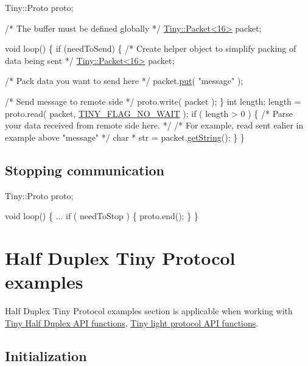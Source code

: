 \begin{DoxyCode}
Tiny::Proto proto;

\textcolor{comment}{/* The buffer must be defined globally */}
\hyperlink{classTiny_1_1Packet}{Tiny::Packet<16>} packet;

\textcolor{keywordtype}{void} loop()
\{
    \textcolor{keywordflow}{if} (needToSend)
    \{
        \textcolor{comment}{/* Create helper object to simplify packing of data being sent */}
        \hyperlink{classTiny_1_1Packet}{Tiny::Packet<16>} packet;

        \textcolor{comment}{/* Pack data you want to send here */}
        packet.\hyperlink{classTiny_1_1IPacket_a9d5ba62a453b9cd364c0e214c245f11d}{put}( \textcolor{stringliteral}{"message"} );

        \textcolor{comment}{/* Send message to remote side */}
        proto.write( packet );
    \}
    \textcolor{keywordtype}{int} length;
    length = proto.read( packet, \hyperlink{group__FLAGS__GROUP_gadadd60eb21d7949e6d097ad36aab9b2e}{TINY\_FLAG\_NO\_WAIT} );
    \textcolor{keywordflow}{if} ( length > 0 )
    \{
        \textcolor{comment}{/* Parse your data received from remote side here. */}
        \textcolor{comment}{/* For example, read sent ealier in example above "message" */}
        \textcolor{keywordtype}{char} * str = packet.\hyperlink{classTiny_1_1IPacket_ac6e6a22ce9a652954491a8d4db081d79}{getString}();
    \}
\}
\end{DoxyCode}
\hypertarget{arduino_arduino_tiny_close}{}\subsection{Stopping communication}\label{arduino_arduino_tiny_close}

\begin{DoxyCode}
Tiny::Proto proto;

\textcolor{keywordtype}{void} loop()
\{
    ...
    \textcolor{keywordflow}{if} ( needToStop )
    \{
        proto.end();
    \}
\}
\end{DoxyCode}
\hypertarget{arduino_arduino_tiny_hd}{}\section{Half Duplex Tiny Protocol examples}\label{arduino_arduino_tiny_hd}
Half Duplex Tiny Protocol examples section is applicable when working with \hyperlink{group__HALF__DUPLEX__API}{Tiny Half Duplex A\+PI functions}, \hyperlink{group__LIGHT__API}{Tiny light protocol A\+PI functions}.\hypertarget{arduino_arduino_tiny_hd_init}{}\subsection{Initialization}\label{arduino_arduino_tiny_hd_init}

